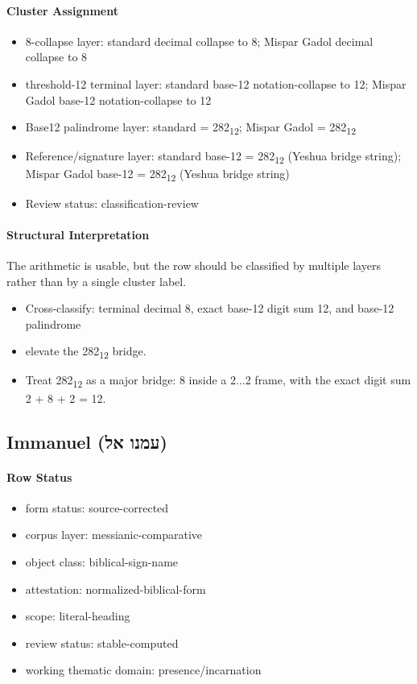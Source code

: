 \paragraph{Cluster Assignment}
\begin{itemize}
\item 8-collapse layer: standard decimal collapse to 8; Mispar Gadol decimal collapse to 8
\item threshold-12 terminal layer: standard base-12 notation-collapse to 12; Mispar Gadol base-12 notation-collapse to 12
\item Base12 palindrome layer: standard = 282\textsubscript{12}; Mispar Gadol = 282\textsubscript{12}
\item Reference/signature layer: standard base-12 = 282\textsubscript{12} (Yeshua bridge string); Mispar Gadol base-12 = 282\textsubscript{12} (Yeshua bridge string)
\item Review status: classification-review
\end{itemize}
\paragraph{Structural Interpretation}
The arithmetic is usable, but the row should be classified by multiple layers rather than by a single cluster label.

\begin{itemize}
\item Cross-classify: terminal decimal 8, exact base-12 digit sum 12, and base-12 palindrome
\item elevate the 282\textsubscript{12} bridge.
\item Treat 282\textsubscript{12} as a major bridge: 8 inside a 2...2 frame, with the exact digit sum 2 + 8 + 2 = 12.
\end{itemize}

\subsection{Immanuel (עמנו אל)}
\paragraph{Row Status}
\begin{itemize}
\item form status: source-corrected
\item corpus layer: messianic-comparative
\item object class: biblical-sign-name
\item attestation: normalized-biblical-form
\item scope: literal-heading
\item review status: stable-computed
\item working thematic domain: presence/incarnation
\end{itemize}
